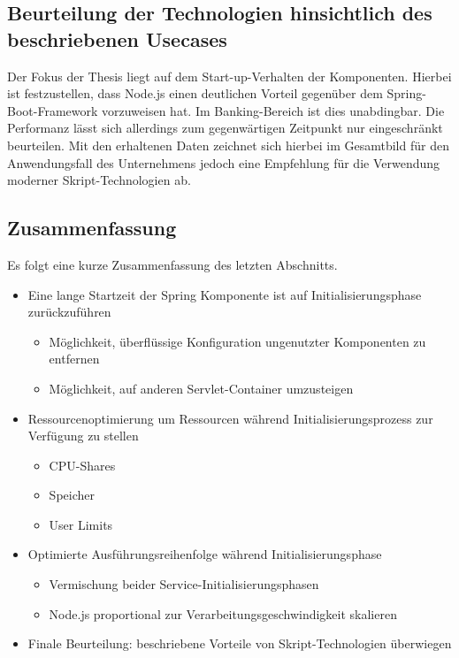 \subsection{Beurteilung der Technologien hinsichtlich des beschriebenen Usecases}
Der Fokus der Thesis liegt auf dem Start-up-Verhalten der Komponenten. Hierbei ist festzustellen, dass Node.js einen deutlichen Vorteil gegenüber dem Spring-Boot-Framework vorzuweisen hat. Im Banking-Bereich ist dies unabdingbar. Die Performanz lässt sich allerdings zum gegenwärtigen Zeitpunkt nur eingeschränkt beurteilen. Mit den erhaltenen Daten zeichnet sich hierbei im Gesamtbild für den Anwendungsfall des Unternehmens jedoch eine Empfehlung für die Verwendung moderner Skript-Technologien ab. 

\newpage

\subsection{Zusammenfassung}

Es folgt eine kurze Zusammenfassung des letzten Abschnitts.

\begin{itemize}
	\item Eine lange Startzeit der Spring Komponente ist auf Initialisierungsphase zurückzuführen
	\begin{itemize}
		\item Möglichkeit, überflüssige Konfiguration ungenutzter Komponenten zu entfernen
		\item Möglichkeit, auf anderen Servlet-Container umzusteigen
	\end{itemize}
	\item Ressourcenoptimierung um Ressourcen während Initialisierungsprozess zur Verfügung zu stellen
	\begin{itemize}
		\item CPU-Shares
		\item Speicher
		\item User Limits
	\end{itemize}
	\item Optimierte Ausführungsreihenfolge während Initialisierungsphase
	\begin{itemize}
		\item Vermischung beider Service-Initialisierungsphasen
		\item Node.js proportional zur Verarbeitungsgeschwindigkeit skalieren
	\end{itemize}
	\item Finale Beurteilung: beschriebene Vorteile von Skript-Technologien überwiegen
\end{itemize}
